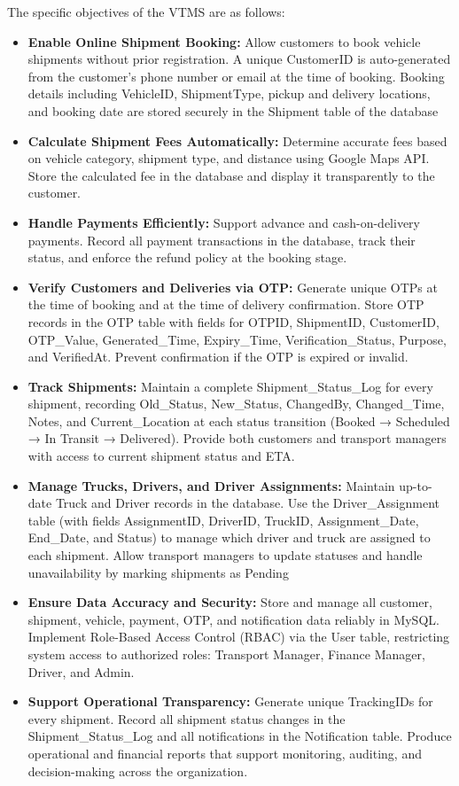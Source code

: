 \documentclass[12pt,a4paper]{report}
\begin{document}
The specific objectives of the VTMS are as follows:
\begin{itemize}
    \item \textbf{Enable Online Shipment Booking: }Allow customers to book vehicle shipments without prior registration. A unique CustomerID is auto-generated from the customer's phone number or email at the time of booking. Booking details including VehicleID, ShipmentType, pickup and delivery locations, and booking date are stored securely in the Shipment table of the database
      \item \textbf{Calculate Shipment Fees Automatically:} Determine accurate fees based on vehicle category, shipment type, and distance using Google Maps API. Store the calculated fee in the database and display it transparently to the customer.
      
      \item \textbf{Handle Payments Efficiently:} Support advance and cash-on-delivery payments. Record all payment transactions in the database, track their status, and enforce the refund policy at the booking stage.
    
    \item \textbf{Verify Customers and Deliveries via OTP:} Generate unique OTPs at the time of booking and at the time of delivery confirmation. Store OTP records in the OTP table with fields for OTPID, ShipmentID, CustomerID, OTP\_Value, Generated\_Time, Expiry\_Time, Verification\_Status, Purpose, and VerifiedAt. Prevent confirmation if the OTP is expired or invalid.
    
     \item \textbf{Track Shipments:} Maintain a complete Shipment\_Status\_Log for every shipment, recording Old\_Status, New\_Status, ChangedBy, Changed\_Time, Notes, and Current\_Location at each status transition (Booked → Scheduled → In Transit → Delivered). Provide both customers and transport managers with access to current shipment status and ETA.
    \item \textbf{Manage Trucks, Drivers, and Driver Assignments: }Maintain up-to-date Truck and Driver records in the database. Use the Driver\_Assignment table (with fields AssignmentID, DriverID, TruckID, Assignment\_Date, End\_Date, and Status) to manage which driver and truck are assigned to each shipment. Allow transport managers to update statuses and handle unavailability by marking shipments as Pending
    \item \textbf{Ensure Data Accuracy and Security:} Store and manage all customer, shipment, vehicle, payment, OTP, and notification data reliably in MySQL. Implement Role-Based Access Control (RBAC) via the User table, restricting system access to authorized roles: Transport Manager, Finance Manager, Driver, and Admin.
     \item \textbf{Support Operational Transparency:} Generate unique TrackingIDs for every shipment. Record all shipment status changes in the Shipment\_Status\_Log and all notifications in the Notification table. Produce operational and financial reports that support monitoring, auditing, and decision-making across the organization.
\end{itemize}
\end{document}

